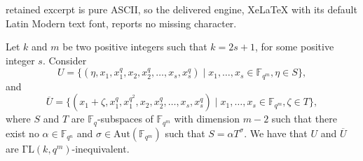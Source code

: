 \documentclass[10pt,a4paper]{amsart}
\newcommand{\fqm}{\mathbb{F}_{q^m}}
\newcommand{\fqn}{\mathbb{F}_{q^n}}
\newcommand{\fq}{{\mathbb F}_{q}}
\begin{document}
retained excerpt is pure ASCII, so the delivered engine, XeLaTeX with its default Latin Modern text font, reports no missing character.
\begin{corollary}
    Let $k$ and $m$ be two positive integers such that $k=2s+1$, for some positive integer $s$.
    Consider
    $$U=\{(\eta,x_1,x_1^{q}, x_2, x_2^{q}, \ldots, x_s,x_s^{q} )\mid x_1,\ldots,x_s\in \mathbb{F}_{q^m}, \eta\in S\},$$
    and
    $$\overline{U}=\{(x_1+\zeta,x_1^q,x_1^{q^2}, x_2, x_2^{q}, \ldots, x_s,x_s^{q} )\mid x_1,\ldots,x_s\in \mathbb{F}_{q^m}, \zeta\in T\},$$
    where $S$ and $T$ are $\fq$-subspaces of $\fqm$ with dimension $m-2$ such that there exist no $\alpha \in \fqn$ and $\sigma \in \mathrm{Aut}(\fqm)$ such that $S=\alpha T^\sigma$.
    We have that $U$ and $\overline{U}$ are $\mathrm{\Gamma L}(k,q^m)$-inequivalent.
\end{corollary}
\end{document}
